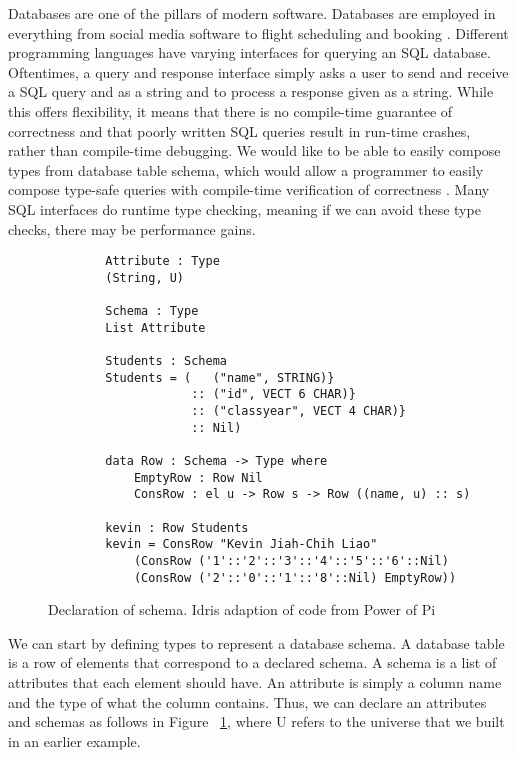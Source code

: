 Databases are one of the pillars of modern software. Databases are employed in
everything from social media software \cite{tao} to flight scheduling and
booking \cite{flights}. Different programming languages have varying interfaces
for querying an SQL database. Oftentimes, a query and response interface simply
asks a user to send and receive a SQL query and as a string and to process a
response given as a string. While this offers flexibility, it means that there
is no compile-time guarantee of correctness and that poorly written SQL queries
result in run-time crashes, rather than compile-time debugging. We would like to
be able to easily compose types from database table schema, which would allow a
programmer to easily compose type-safe queries with compile-time verification of
correctness \cite{power_of_pi}. Many SQL interfaces do runtime type checking,
meaning if we can avoid these type checks, there may be performance gains. 

\begin{figure}[h]
    \caption{Declaration of schema. Idris adaption of code from Power of Pi \protect\cite{power_of_pi}}
    \label{schema}
    \begin{lstlisting}
        Attribute : Type
        (String, U)

        Schema : Type
        List Attribute

        Students : Schema
        Students = (   ("name", STRING)}
                    :: ("id", VECT 6 CHAR)} 
                    :: ("classyear", VECT 4 CHAR)}
                    :: Nil)

        data Row : Schema -> Type where
            EmptyRow : Row Nil
            ConsRow : el u -> Row s -> Row ((name, u) :: s)

        kevin : Row Students
        kevin = ConsRow "Kevin Jiah-Chih Liao"
            (ConsRow ('1'::'2'::'3'::'4'::'5'::'6'::Nil)
            (ConsRow ('2'::'0'::'1'::'8'::Nil) EmptyRow))
    \end{lstlisting}
\end{figure}

We can start by defining types to represent a database schema. A database table
is a row of elements that correspond to a declared schema. A schema is a list of
attributes that each element should have. An attribute is simply a column name
and the type of what the column contains. Thus, we can declare an attributes and
schemas as follows in Figure ~\ref{schema}, where U refers to the universe that
we built in an earlier example. 

